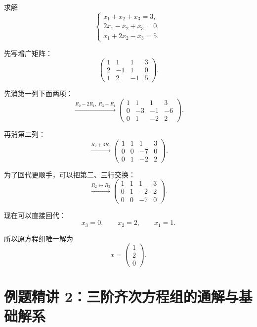 \documentclass[11pt,oneside,UTF8]{ctexbook}
\begin{document}
\begin{examplebox}
求解
\[
\begin{cases}
x_1+x_2+x_3=3,\\
2x_1-x_2+x_3=0,\\
x_1+2x_2-x_3=5.
\end{cases}
\]

先写增广矩阵：
\[
\left(
\begin{array}{ccc|c}
1&1&1&3\\
2&-1&1&0\\
1&2&-1&5
\end{array}
\right).
\]

先消第一列下面两项：
\[
\xrightarrow{R_2-2R_1,\;R_3-R_1}
\left(
\begin{array}{ccc|c}
1&1&1&3\\
0&-3&-1&-6\\
0&1&-2&2
\end{array}
\right).
\]

再消第二列：
\[
\xrightarrow{R_2+3R_3}
\left(
\begin{array}{ccc|c}
1&1&1&3\\
0&0&-7&0\\
0&1&-2&2
\end{array}
\right).
\]

为了回代更顺手，可以把第二、三行交换：
\[
\xrightarrow{R_2\leftrightarrow R_3}
\left(
\begin{array}{ccc|c}
1&1&1&3\\
0&1&-2&2\\
0&0&-7&0
\end{array}
\right).
\]

现在可以直接回代：
\[
x_3=0,\qquad x_2=2,\qquad x_1=1.
\]

所以原方程组唯一解为
\[
x=
\begin{pmatrix}
1\\2\\0
\end{pmatrix}.
\]
\end{examplebox}

\section{例题精讲 2：三阶齐次方程组的通解与基础解系}
\end{document}
